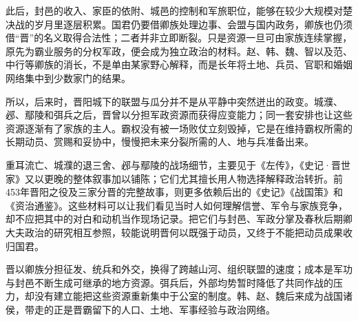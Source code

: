 此后，封邑的收入、家臣的依附、城邑的控制和军旅职位，能够在较少大规模对楚决战的岁月里逐层积累。国君仍要借卿族处理边事、会盟与国内政务，卿族也仍须借“晋”的名义取得合法性；二者并非立即断裂。只是资源一旦可由家族连续掌握，原先为霸业服务的分权军政，便会成为独立政治的材料。赵、韩、魏、智以及范、中行等卿族的消长，不是单由某家野心解释，而是长年将土地、兵员、官职和婚姻网络集中到少数家门的结果。

所以，后来时，晋阳城下的联盟与瓜分并不是从平静中突然迸出的政变。城濮、邲、鄢陵和弭兵之后，晋曾以分担军政资源而获得应变能力；同一套安排也让这些资源逐渐有了家族的主人。霸权没有被一场败仗立刻毁掉，它是在维持霸权所需的长期动员、赏赐和妥协中，慢慢把未来分裂所需的人、地与兵准备出来。

\begin{sourcenote}
重耳流亡、城濮的退三舍、邲与鄢陵的战场细节，主要见于《左传》，《史记·晋世家》又以更晚的整体叙事加以铺陈；它们尤其擅长用人物选择解释政治转折。前453年晋阳之役及三家分晋的完整故事，则更多依赖后出的《史记》《战国策》和《资治通鉴》。这些材料可以让我们看见当时人如何理解信誉、军令与家族竞争，却不应把其中的对白和动机当作现场记录。把它们与封邑、军政分掌及春秋后期卿大夫政治的研究相互参照，较能说明晋何以既强于动员，又终于不能把动员成果收归国君。
\end{sourcenote}



\begin{turningpoint}
晋以卿族分担征发、统兵和外交，换得了跨越山河、组织联盟的速度；成本是军功与封邑不断生成可继承的地方资源。弭兵后，外部均势暂时降低了共同作战的压力，却没有建立能把这些资源重新集中于公室的制度。韩、赵、魏后来成为战国诸侯，带走的正是晋霸留下的人口、土地、军事经验与政治网络。
\end{turningpoint}

